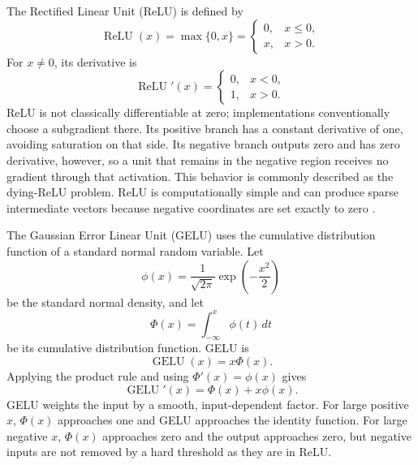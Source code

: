 The Rectified Linear Unit (ReLU) is defined by
\begin{equation}
    \operatorname{ReLU}(x)=\max\{0,x\}
    =
    \begin{cases}
        0, & x\leq 0,\\
        x, & x>0.
    \end{cases}
    \label{eq:act-relu}
\end{equation}
For \(x\neq0\), its derivative is
\begin{equation}
    \operatorname{ReLU}'(x)
    =
    \begin{cases}
        0, & x<0,\\
        1, & x>0.
    \end{cases}
    \label{eq:act-relu-derivative}
\end{equation}
ReLU is not classically differentiable at zero; implementations conventionally
choose a subgradient there. Its positive branch has a constant derivative
of one, avoiding saturation on that side. Its negative branch outputs zero
and has zero derivative, however, so a unit that remains in the negative
region receives no gradient through that activation. This behavior is
commonly described as the dying-ReLU problem. ReLU is computationally
simple and can produce sparse intermediate vectors because negative
coordinates are set exactly to zero \parencite{fang2023raft,zhuo2025polycom}.

The Gaussian Error Linear Unit (GELU) uses the cumulative distribution
function of a standard normal random variable. Let
\begin{equation}
    \phi(x)
    =
    \frac{1}{\sqrt{2\pi}}\exp\left(-\frac{x^2}{2}\right)
    \label{eq:act-normal-density}
\end{equation}
be the standard normal density, and let
\begin{equation}
    \Phi(x)
    =
    \int_{-\infty}^{x}\phi(t)\,dt
    \label{eq:act-normal-cdf}
\end{equation}
be its cumulative distribution function. GELU is
\begin{equation}
    \operatorname{GELU}(x)=x\Phi(x).
    \label{eq:act-gelu}
\end{equation}
Applying the product rule and using \(\Phi'(x)=\phi(x)\) gives
\begin{equation}
    \operatorname{GELU}'(x)
    =
    \Phi(x)+x\phi(x).
    \label{eq:act-gelu-derivative}
\end{equation}
GELU weights the input by a smooth, input-dependent factor. For large
positive \(x\), \(\Phi(x)\) approaches one and GELU approaches the identity
function. For large negative \(x\), \(\Phi(x)\) approaches zero and the
output approaches zero, but negative inputs are not removed by a hard
threshold as they are in ReLU.

